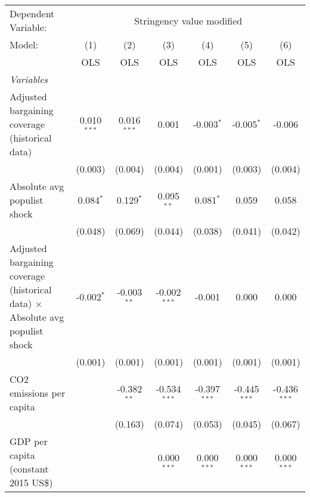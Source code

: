 
\begingroup
\centering
\begin{tabular}{lcccccc}
   \toprule
   Dependent Variable: & \multicolumn{6}{c}{Stringency value modified}\\
   Model:                                                                               & (1)           & (2)           & (3)            & (4)            & (5)            & (6)\\  
                                                                                        &  OLS          & OLS           & OLS            & OLS            & OLS            & OLS\\  
   \midrule
   \emph{Variables}\\
   Adjusted bargaining coverage (historical data)                                       & 0.010$^{***}$ & 0.016$^{***}$ & 0.001          & -0.003$^{*}$   & -0.005$^{*}$   & -0.006\\   
                                                                                        & (0.003)       & (0.004)       & (0.004)        & (0.001)        & (0.003)        & (0.004)\\   
   Absolute avg populist shock                                                          & 0.084$^{*}$   & 0.129$^{*}$   & 0.095$^{**}$   & 0.081$^{*}$    & 0.059          & 0.058\\   
                                                                                        & (0.048)       & (0.069)       & (0.044)        & (0.038)        & (0.041)        & (0.042)\\   
   Adjusted bargaining coverage (historical data) $\times$ Absolute avg populist shock  & -0.002$^{*}$  & -0.003$^{**}$ & -0.002$^{***}$ & -0.001         & 0.000          & 0.000\\   
                                                                                        & (0.001)       & (0.001)       & (0.001)        & (0.001)        & (0.001)        & (0.001)\\   
   CO2 emissions per capita                                                             &               & -0.382$^{**}$ & -0.534$^{***}$ & -0.397$^{***}$ & -0.445$^{***}$ & -0.436$^{***}$\\   
                                                                                        &               & (0.163)       & (0.074)        & (0.053)        & (0.045)        & (0.067)\\   
   GDP per capita (constant 2015 US\$)                                                  &               &               & 0.000$^{***}$  & 0.000$^{***}$  & 0.000$^{***}$  & 0.000$^{***}$\\   

\end{tabular}
